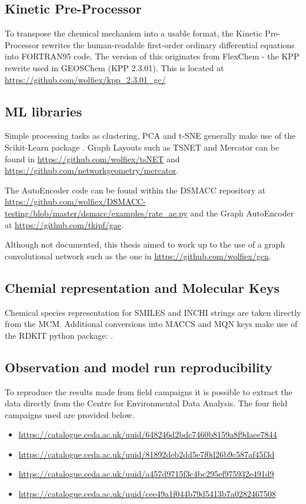 \subsection*{Kinetic Pre-Processor}
To transpose the chemical mechanism into a usable format, the Kinetic Pre-Processor rewrites the human-readable first-order ordinary differential equations into FORTRAN95 code. The version of this originates from FlexChem  - the KPP rewrite used in GEOSChem (KPP 2.3.01). This is located at \url{https://github.com/wolfiex/kpp_2.3.01_gc/}

\subsection*{ML libraries}
Simple processing tasks as clustering, PCA and t-SNE generally make use of the Scikit-Learn package \citep{sklearn}.
Graph Layouts such as TSNET and Mercator can be found in \url{https://github.com/wolfiex/tsNET} and \url{https://github.com/networkgeometry/mercator}.

The AutoEncoder code can be found within the DSMACC repository at \url{https://github.com/wolfiex/DSMACC-testing/blob/master/dsmacc/examples/rate_ae.py} and the Graph AutoEncoder at \url{https://github.com/tkipf/gae}.


Although not documented, this thesis aimed to work up to the use of a graph convolutional network such as the one in \url{https://github.com/wolfiex/gcn}.

\subsection*{Chemial representation and Molecular Keys}
Chemical species representation for SMILES and INCHI strings are taken directly from the MCM. Additional conversions into MACCS and MQN keys make use of the RDKIT  python package: \citep{rdkit}.

\subsection*{Observation and model run reproducibility}
To reproduce the results made from field campaigns it is possible to extract the data directly from the Centre for Environmental Data Analysis. The four field campaigns used are provided below.

\begin{itemize}
 \item{\url{https://catalogue.ceda.ac.uk/uuid/648246d2bdc7460b8159a8f9daee7844}}
 \item {\url{https://catalogue.ceda.ac.uk/uuid/81892deb2dd5e7f0d26b9c587af45f3d}}
 \item{\url{https://catalogue.ceda.ac.uk/uuid/a457d9715f3c4bc295ef975932e491d9}}
 \item {\url{https://catalogue.ceda.ac.uk/uuid/cee49a1f044b79d5413b7a0282467508}}
\end{itemize}

